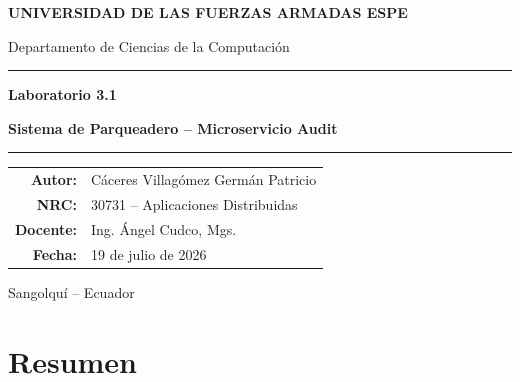 \documentclass[12pt,letterpaper]{article}
\begin{document}
\begin{titlepage}
  \centering
  \vspace*{1cm}

  {\large\bfseries UNIVERSIDAD DE LAS FUERZAS ARMADAS ESPE\par}
  \vspace{0.3cm}
  {\normalsize Departamento de Ciencias de la Computación\par}

  \vspace{2.5cm}

  \rule{\linewidth}{0.4pt}
  \vspace{0.4cm}
  {\Large\bfseries Laboratorio 3.1\par}
  \vspace{0.2cm}
  {\Large\bfseries Sistema de Parqueadero -- Microservicio Audit\par}
  \vspace{0.4cm}
  \rule{\linewidth}{0.4pt}

  \vspace{2.5cm}

  \begin{tabular}{rl}
    \textbf{Autor:} & Cáceres Villagómez Germán Patricio \\[0.3em]
    \textbf{NRC:} & 30731 -- Aplicaciones Distribuidas \\[0.3em]
    \textbf{Docente:} & Ing. Ángel Cudco, Mgs. \\[0.3em]
    \textbf{Fecha:} & 19 de julio de 2026 \\
  \end{tabular}

  \vfill

  {\small Sangolquí -- Ecuador\par}
  \vspace{0.3cm}
\end{titlepage}

\tableofcontents
\newpage

\section*{Resumen}
\end{document}

